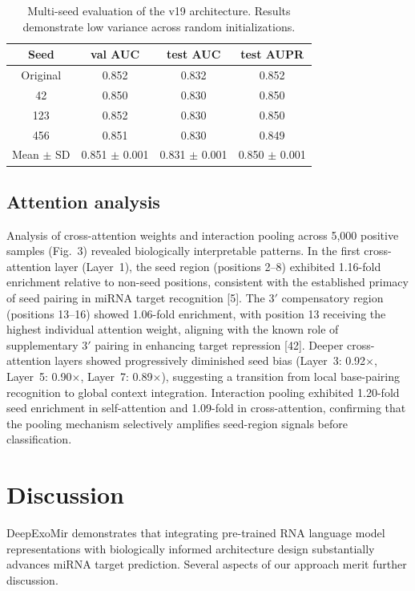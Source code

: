\documentclass[sn-mathphys-num]{sn-jnl}
\begin{document}
\begin{table}[!t]
\caption{Multi-seed evaluation of the v19 architecture. Results demonstrate low variance across random initializations.}\label{tab:seeds}
\begin{tabular}{@{}cccc@{}}
\toprule
Seed & val AUC & test AUC & test AUPR \\
\midrule
Original & 0.852 & 0.832 & 0.852 \\
42 & 0.850 & 0.830 & 0.850 \\
123 & 0.852 & 0.830 & 0.850 \\
456 & 0.851 & 0.830 & 0.849 \\
\midrule
Mean $\pm$ SD & 0.851 $\pm$ 0.001 & 0.831 $\pm$ 0.001 & 0.850 $\pm$ 0.001 \\
\bottomrule
\end{tabular}
\end{table}

\subsection{Attention analysis}

Analysis of cross-attention weights and interaction pooling across 5,000 positive samples (Fig.~3) revealed biologically interpretable patterns. In the first cross-attention layer (Layer~1), the seed region (positions 2--8) exhibited 1.16-fold enrichment relative to non-seed positions, consistent with the established primacy of seed pairing in miRNA target recognition [5]. The 3$'$ compensatory region (positions 13--16) showed 1.06-fold enrichment, with position 13 receiving the highest individual attention weight, aligning with the known role of supplementary 3$'$ pairing in enhancing target repression [42]. Deeper cross-attention layers showed progressively diminished seed bias (Layer~3: 0.92$\times$, Layer~5: 0.90$\times$, Layer~7: 0.89$\times$), suggesting a transition from local base-pairing recognition to global context integration. Interaction pooling exhibited 1.20-fold seed enrichment in self-attention and 1.09-fold in cross-attention, confirming that the pooling mechanism selectively amplifies seed-region signals before classification.


\section{Discussion}\label{sec:discussion}

DeepExoMir demonstrates that integrating pre-trained RNA language model representations with biologically informed architecture design substantially advances miRNA target prediction. Several aspects of our approach merit further discussion.
\end{document}
